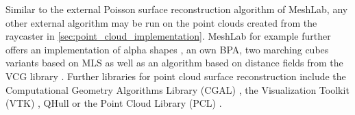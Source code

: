 Similar to the external Poisson surface reconstruction algorithm of MeshLab, any other external algorithm may be run on the point clouds created from the raycaster in \cref{sec:point_cloud_implementation}.
MeshLab for example further offers an implementation of alpha shapes \cite{alpha_shape}, an own BPA, two marching cubes variants based on MLS \cite{meshlab_mc_mls_1, meshlab_mc_mls_2} as well as an algorithm based on distance fields from the VCG library \cite{vcg}.
Further libraries for point cloud surface reconstruction include the Computational Geometry Algorithms Library (CGAL) \cite{cgal}, the Visualization Toolkit (VTK) \cite{vtk}, QHull \cite{qhull} or the Point Cloud Library (PCL) \cite{pcl}.
